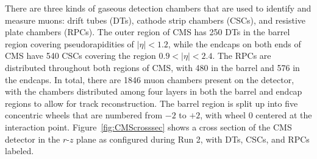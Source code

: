 There are three kinds of gaseous detection chambers that are used to identify and measure muons: drift tubes (DTs), cathode strip chambers (CSCs), and resistive plate chambers (RPCs).
The outer region of CMS has 250 DTs in the barrel region covering pseudorapidities of $|\eta|<1.2$, while the endcaps on both ends of CMS have 540 CSCs covering the region $0.9<|\eta|<2.4$.
The RPCs are distributed throughout both regions of CMS, with 480 in the barrel and 576 in the endcaps.
In total, there are 1846 muon chambers present on the detector, with the chambers distributed among four layers in both the barrel and endcap regions to allow for track reconstruction.
The barrel region is split up into five concentric wheels that are numbered from $-2$ to $+2$, with wheel 0 centered at the interaction point.
Figure~\ref{fig:CMScrosssec} shows a cross section of the CMS detector in the $r$-$z$ plane as configured during Run 2, with DTs, CSCs, and RPCs labeled.

